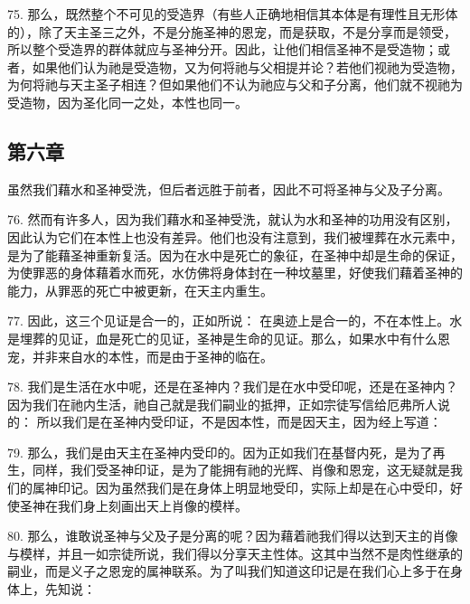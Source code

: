 75. 那么，既然整个不可见的受造界（有些人正确地相信其本体是有理性且无形体的），除了天主圣三之外，不是分施圣神的恩宠，而是获取，不是分享而是领受，所以整个受造界的群体就应与圣神分开。因此，让他们相信圣神不是受造物；或者，如果他们认为祂是受造物，又为何将祂与父相提并论？若他们视祂为受造物，为何将祂与天主圣子相连？但如果他们不认为祂应与父和子分离，他们就不视祂为受造物，因为圣化同一之处，本性也同一。\par


\subsection{第六章}

虽然我们藉水和圣神受洗，但后者远胜于前者，因此不可将圣神与父及子分离。\par

76. 然而有许多人，因为我们藉水和圣神受洗，就认为水和圣神的功用没有区别，因此认为它们在本性上也没有差异。他们也没有注意到，我们被埋葬在水元素中，是为了能藉圣神重新复活。因为在水中是死亡的象征，在圣神中却是生命的保证，为使罪恶的身体藉着水而死，水仿佛将身体封在一种坟墓里，好使我们藉着圣神的能力，从罪恶的死亡中被更新，在天主内重生。\par

77. 因此，这三个见证是合一的，正如所说： 在奥迹上是合一的，不在本性上。水是埋葬的见证，血是死亡的见证，圣神是生命的见证。那么，如果水中有什么恩宠，并非来自水的本性，而是由于圣神的临在。\par

78. 我们是生活在水中呢，还是在圣神内？我们是在水中受印呢，还是在圣神内？因为我们在祂内生活，祂自己就是我们嗣业的抵押，正如宗徒写信给厄弗所人说的： 所以我们是在圣神内受印证，不是因本性，而是因天主，因为经上写道：\par

79. 那么，我们是由天主在圣神内受印的。因为正如我们在基督内死，是为了再生，同样，我们受圣神印证，是为了能拥有祂的光辉、肖像和恩宠，这无疑就是我们的属神印记。因为虽然我们是在身体上明显地受印，实际上却是在心中受印，好使圣神在我们身上刻画出天上肖像的模样。\par

80. 那么，谁敢说圣神与父及子是分离的呢？因为藉着祂我们得以达到天主的肖像与模样，并且一如宗徒所说，我们得以分享天主性体。这其中当然不是肉性继承的嗣业，而是义子之恩宠的属神联系。为了叫我们知道这印记是在我们心上多于在身体上，先知说：\par

